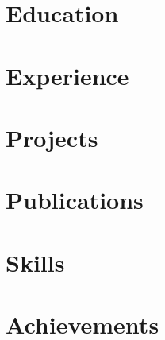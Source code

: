 \documentclass[letter,10pt]{article}
\def\website{web.njit.edu/$\sim$vg472}
\begin{document}
%

\section{Education}


\section{Experience}


\section{Projects}


\section{Publications}


\section{Skills}



\section{Achievements}



\end{document}
